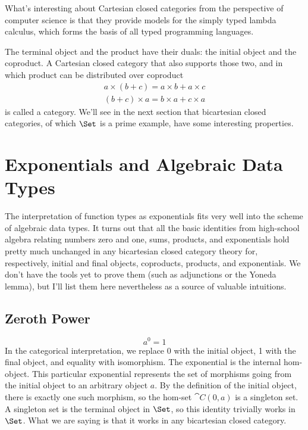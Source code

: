 What's interesting about Cartesian closed categories from the
perspective of computer science is that they provide models for the
simply typed lambda calculus, which forms the basis of all typed
programming languages.

The terminal object and the product have their duals: the initial object
and the coproduct. A Cartesian closed category that also supports those
two, and in which product can be distributed over coproduct
\begin{gather*}
a \times (b + c) = a \times b + a \times c \\
(b + c) \times a = b \times a + c \times a
\end{gather*}
is called a  category. We'll see in the next
section that bicartesian closed categories, of which $\Set$ is a
prime example, have some interesting properties.

\section{Exponentials and Algebraic Data Types}

The interpretation of function types as exponentials fits very well into
the scheme of algebraic data types. It turns out that all the basic
identities from high-school algebra relating numbers zero and one, sums,
products, and exponentials hold pretty much unchanged in any bicartesian
closed category theory for, respectively, initial and final objects,
coproducts, products, and exponentials. We don't have the tools yet to
prove them (such as adjunctions or the Yoneda lemma), but I'll list them
here nevertheless as a source of valuable intuitions.

\subsection{Zeroth Power}

\[a^{0} = 1\]
In the categorical interpretation, we replace 0 with the initial object,
1 with the final object, and equality with isomorphism. The exponential
is the internal hom-object. This particular exponential represents the
set of morphisms going from the initial object to an arbitrary object
$a$. By the definition of the initial object, there is exactly
one such morphism, so the hom-set $\cat{C}(0, a)$ is a singleton set. A
singleton set is the terminal object in $\Set$, so this identity
trivially works in $\Set$. What we are saying is that it works in
any bicartesian closed category.

